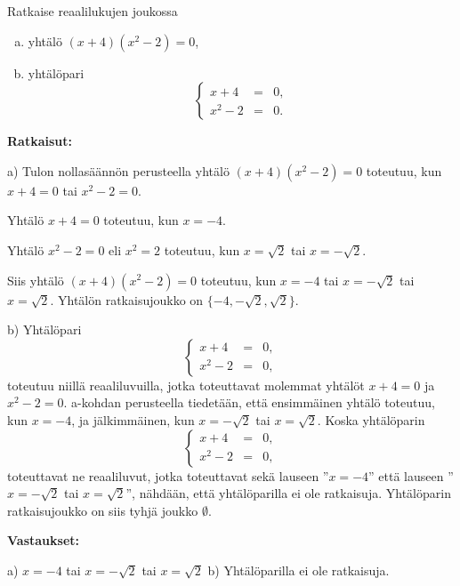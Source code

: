 \newpage

\begin{esimerkki}
Ratkaise reaalilukujen joukossa
\begin{enumerate}[a)]
\item yhtälö $(x + 4)(x^2 - 2) = 0$,
\item yhtälöpari
\[
\left\{
\begin{array}{rcl}
x + 4 & = & 0, \\
x^2 - 2 & = & 0.
\end{array}\right.
\]
\end{enumerate}

{\bf Ratkaisut:}

a) Tulon nollasäännön perusteella yhtälö $(x + 4)(x^2 -
2) = 0$ toteutuu, kun $x + 4 = 0$ tai $x^2 - 2 = 0$.

Yhtälö $x + 4 = 0$ toteutuu, kun $x = -4$.

Yhtälö $x^2 - 2 = 0$ eli $x^2 = 2$ toteutuu, kun $x =
\sqrt{2}$ tai $x = -\sqrt{2}$.

Siis yhtälö $(x + 4)(x^2 - 2) = 0$ toteutuu, kun $x =
-4$ tai $x = -\sqrt{2}$ tai $x = \sqrt{2}$. Yhtälön
ratkaisujoukko on $\{-4, -\sqrt{2}, \sqrt{2} \}$.

b) Yhtälöpari
\[
\left\{
\begin{array}{rcl}
x + 4 & = & 0, \\
x^2 - 2 & = & 0,
\end{array}\right.
\]
toteutuu niillä reaaliluvuilla, jotka toteuttavat
molemmat yhtälöt $x + 4 = 0$ ja $x^2 - 2 = 0$. a-kohdan
perusteella tiedetään, että ensimmäinen yhtälö toteutuu,
kun $x = -4$, ja jälkimmäinen, kun $x = -\sqrt{2}$ tai $x
= \sqrt{2}$. Koska yhtälöparin
\[
\left\{
\begin{array}{rcl}
x + 4 & = & 0, \\
x^2 - 2 & = & 0,
\end{array}\right.
\]
toteuttavat ne reaaliluvut, jotka toteuttavat sekä
lauseen ''$x = -4$'' että lauseen ''$x = -\sqrt{2}$ tai
$x = \sqrt{2}$'', nähdään, että yhtälöparilla ei ole
ratkaisuja. Yhtälöparin ratkaisujoukko on siis tyhjä
joukko $\emptyset$.

{\bf Vastaukset:}

a) $x = -4$ tai $x = -\sqrt{2}$ tai $x = \sqrt{2}$
b) Yhtälöparilla ei ole ratkaisuja.
\end{esimerkki}

\Harjoitustehtavat

